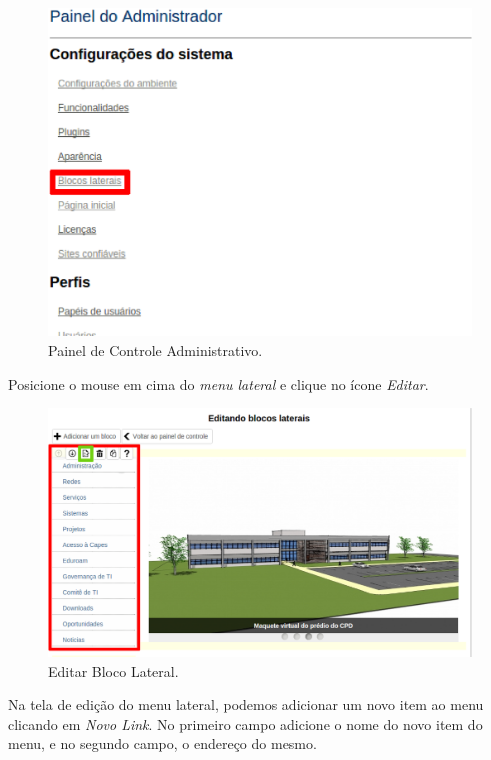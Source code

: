 \begin{figure}[h]
     \centering
       \includegraphics[keepaspectratio=true,scale=0.4]{figuras/administracao.eps}
     \caption{Painel de Controle Administrativo.}
     \label{fig:painelAdministrativo}
\end{figure}

Posicione o mouse em cima do \emph{\color{red}menu lateral} e clique no ícone \emph{\color{green}Editar}.

\begin{figure}[h]
     \centering
       \includegraphics[keepaspectratio=true,scale=0.4]{figuras/editarBlocoLateral.eps}
     \caption{Editar Bloco Lateral.}
     \label{fig:editarBloco}
\end{figure}

\newpage
Na tela de edição do menu lateral, podemos adicionar um novo item ao menu clicando em \emph{\color{red}Novo Link}. No primeiro campo adicione o nome do novo item do menu, e no segundo campo, o endereço do mesmo.

